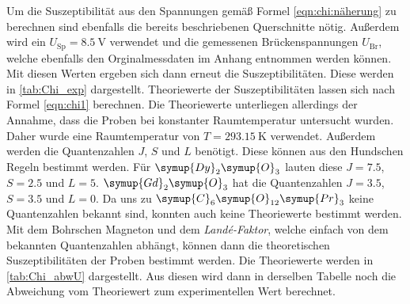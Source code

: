 Um die Suszeptibilität aus den Spannungen gemäß Formel \autoref{eqn:chi:näherung} zu berechnen sind ebenfalls die bereits beschriebenen Querschnitte nötig. Außerdem wird ein 
$U_{\text{Sp}} = \qty{8.5}{\volt}$ verwendet und die gemessenen Brückenspannungen $U_{\text{Br}}$, welche ebenfalls den Orginalmessdaten im Anhang entnommen werden können.
Mit diesen Werten ergeben sich dann erneut die Suszeptibilitäten. Diese werden in \autoref{tab:Chi_exp} dargestellt.
Theoriewerte der Suszeptibilitäten lassen sich nach Formel \eqref{eqn:chi1} berechnen. Die Theoriewerte unterliegen allerdings der Annahme, dass die Proben bei konstanter 
Raumtemperatur untersucht wurden. Daher wurde eine Raumtemperatur von $T = \qty{293.15}{\kelvin}$ verwendet. Außerdem werden die Quantenzahlen $J$, $S$ und $L$ benötigt. Diese
können aus den Hundschen Regeln bestimmt werden. Für $\symup{Dy}_2\symup{O}_3$ lauten diese $J = 7.5$, $S = 2.5$ und $L = 5$. $\symup{Gd}_2\symup{O}_3$ hat die Quantenzahlen
$J = 3.5$, $S = 3.5$ und $L = 0$. Da uns zu $\symup{C}_6\symup{O}_{12}\symup{Pr}_3$ keine Quantenzahlen bekannt sind, konnten auch keine Theoriewerte bestimmt werden.
Mit dem Bohrschen Magneton und dem \textit{Landé-Faktor}, welche einfach von dem bekannten Quantenzahlen abhängt, können dann die theoretischen Suszeptibilitäten der Proben
bestimmt werden. Die Theoriewerte werden in \autoref{tab:Chi_abwU} dargestellt. Aus diesen wird dann in derselben Tabelle noch die Abweichung vom Theoriewert zum experimentellen
Wert berechnet. 

